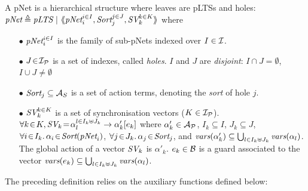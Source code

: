 \documentclass{lncs/llncs}
\begin{document}
\begin{definition}[pNets]\label{def-pnets}
A pNet is a hierarchical structure where leaves are pLTSs and holes:\\
$\pNet\triangleq \pLTS~|~\mylangle \pNet_i^{i\in I}, \Sort_j^{j\in J}, \symb{SV}_k^{k\in 
K}\myrangle$
where
\begin{itemize}
\item[$\bullet$] $\pNet_i^{i\in I}$ is the family of sub-pNets indexed over $I \in \I$.

\item[$\bullet$] $J\!\in\!\I_\P$ is a set of indexes, called \emph{holes}.
$I$ and $J$ are \emph{disjoint}: $I\!\cap\! J=\emptyset$,  $I\!\cup\! J\neq\emptyset$
\item[$\bullet$] $\Sort_j \subseteq \AlgAS$ is a set of action terms, denoting the 
\emph{sort} of
hole $j$.

\item[$\bullet$] $\symb{SV}_k^{k\in K}$ is a set of
  synchronisation vectors ($K\in\I_\P$). $\forall k\!\in\! K,
  \symb{SV}_k\!=\!\SV{\alpha_{l}^{l\in I_k \uplus J_k}}{\alpha'_k}{e_k}$ where
  $\alpha'_k\in \mathcal{A}_\P$, $I_k\subseteq I$, $J_k\subseteq J$,
  $\forall i\!\in\!
  I_k.\,\alpha_{i}\!\in\!\Sort(\pNet_i)$,  $\forall j\!\in\!
  J_k.\,\alpha_{j}\!\in\!\Sort_j$, and $\vars(\alpha'_k)\subseteq \bigcup_{l\in I_k\uplus 
  J_k}{\vars({\alpha_l})}$. The global action of a vector $\symb{SV}_k$ is
$\alpha'_k$. $e_k \in \AlgB$ is a guard associated to the vector 
$\vars(e_k)\subseteq \bigcup_{l\in I_k\uplus J_k}{\vars({\alpha_l})}$.


\end{itemize}
\end{definition}

The preceding definition relies on the auxiliary functions defined below:
\end{document}
